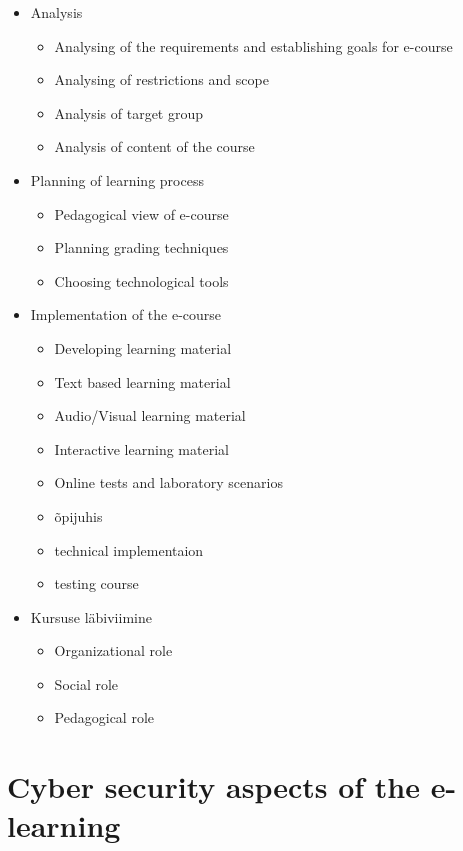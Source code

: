 \begin{itemize}
	\item Analysis
	\begin{itemize}
		\item Analysing of the requirements and establishing goals for e-course
		\item Analysing of restrictions and scope
		\item Analysis of target group
		\item Analysis of content of the course
	\end{itemize}
	\item Planning of learning process
	\begin{itemize}
		\item Pedagogical view of e-course
		\item Planning grading techniques
		\item Choosing technological tools
	\end{itemize}
	\item Implementation of the e-course
	\begin{itemize}
		\item Developing learning material
		\item Text based learning material
		\item Audio/Visual learning material
		\item Interactive learning material
		\item Online tests and laboratory scenarios 
		\item õpijuhis 
		\item technical implementaion
		\item testing course
	\end{itemize}
	\item Kursuse läbiviimine
	\begin{itemize}
		\item Organizational role
		\item Social role
		\item Pedagogical role
	\end{itemize}
\end{itemize}

\section{Cyber security aspects of the e-learning}
